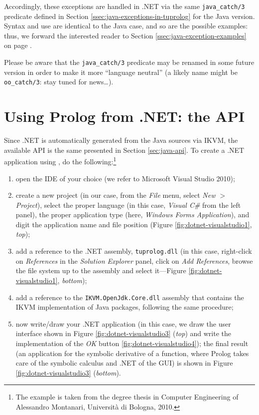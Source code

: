 Accordingly, these exceptions are handled in \tuprolog{}.NET via the same \texttt{java\_catch/3} predicate defined in Section \ref{ssec:java-exceptions-in-tuprolog} for the Java version.
%
Syntax and use are identical to the Java case, and so are the possible examples: thus, we forward the interested reader to Section \ref{ssec:java-exception-examples} on page \pageref{ssec:java-exception-examples}.

\color{red}
Please be aware that the \texttt{java\_catch/3} predicate may be renamed in some future \tuprolog{} version in order to make it more ``language neutral'' (a likely name might be \texttt{oo\_catch/3}: stay tuned for news\ldots).
\normalcolor

\section{Using Prolog from .NET: the API}
\label{sec:dotnet-oo-api}

Since \tuprolog{}.NET is automatically generated from the Java sources via IKVM, the available API is the same presented in Section \ref{sec:java-api}.
%
To create a .NET application using \tuprolog{}, do the following:\footnote{The example is taken from the degree thesis in Computer Engineering of Alessandro Montanari, Universit\`{a} di Bologna, 2010.}

\begin{enumerate}
  \item open the IDE of your choice (we refer to Microsoft Visual Studio 2010);
  \item create a new project (in our case, from the \textit{File} menu, select \textit{New $>$ Project}), select the proper language (in this case, \textit{Visual C\#} from the left panel), the proper application type (here, \textit{Windows Forms Application}), and digit the application name and file position (Figure \ref{fig:dotnet-visualstudio1}, \textit{top});
  \item add a reference to the \tuprolog{}.NET assembly, \texttt{tuprolog.dll} (in this case, right-click on \textit{References} in the \textit{Solution Explorer} panel, click on \textit{Add References}, browse the file system up to the assembly and select it---Figure \ref{fig:dotnet-visualstudio1}, \textit{bottom});
  \item add a reference to the \texttt{IKVM.OpenJdk.Core.dll} assembly that contains the IKVM implementation of Java packages, following the same procedure;
  \item now write/draw your .NET application (in this case, we draw the user interface shown in Figure \ref{fig:dotnet-visualstudio3} (\textit{top}) and write the implementation of the \textit{OK} button \ref{fig:dotnet-visualstudio4}); the final result (an application for the symbolic derivative of a function, where Prolog takes care of the symbolic calculus and .NET of the GUI) is shown in Figure \ref{fig:dotnet-visualstudio3} (\textit{bottom}).
\end{enumerate}

